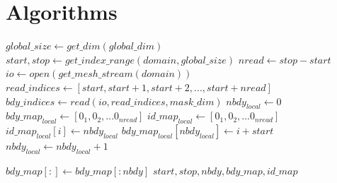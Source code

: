 \documentclass{article}
\begin{document}
\section {Algorithms}
\vspace{5mm}
\begin{algorithm}
\caption{Read the $mask\_dim$ in contiguous chunks, returning $start, stop, nbdy_{local}, X_{local}, Y_{local}$}\label{readbdymask}
\begin{algorithmic}[1]
    \State
    \State $global\_size \gets get\_dim(global\_dim)$
    \State $start, stop \gets get\_index\_range(domain, global\_size)$
    \State $nread \gets stop - start$
    \State $io \gets open(get\_mesh\_stream(domain))$
    \State $read\_indices \gets [start, start+1, start+2, ..., start + nread]$
    \State
    \State $bdy\_indices \gets read(io, read\_indices, mask\_dim)$
    \State $nbdy_{local} \gets 0$
    \State $bdy\_map_{local} \gets [0_1, 0_2, ...0_{nread}]$
    \State $id\_map_{local} \gets [0_1, 0_2, ...0_{nread}]$
            \State $id\_map_{local}[i] \gets nbdy_{local}$
            \State $bdy\_map_{local}[nbdy_{local}] \gets i + start$
            \State $nbdy_{local} \gets nbdy_{local} + 1$
        \EndIf
    \EndFor

    \State $bdy\_map[:] \gets bdy\_map[:nbdy]$
    \State \Return $start, stop, nbdy, bdy\_map, id\_map$
\EndFunction
\end{algorithmic}
\end{algorithm}
\end{document}
